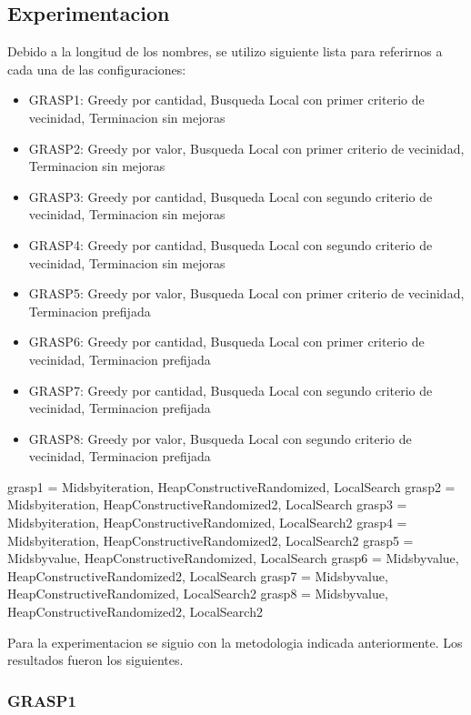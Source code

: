 \subsection{Experimentacion}

Debido a la longitud de los nombres, se utilizo siguiente lista para referirnos a cada una de las configuraciones:

\begin{itemize}
	\item GRASP1: Greedy por cantidad, Busqueda Local con primer criterio de vecinidad, Terminacion sin mejoras
	\item GRASP2: Greedy por valor, Busqueda Local con primer criterio de vecinidad, Terminacion sin mejoras
	\item GRASP3: Greedy por cantidad, Busqueda Local con segundo criterio de vecinidad, Terminacion sin mejoras
	\item GRASP4: Greedy por cantidad, Busqueda Local con segundo criterio de vecinidad, Terminacion sin mejoras
	\item GRASP5: Greedy por valor, Busqueda Local con primer criterio de vecinidad, Terminacion prefijada
	\item GRASP6: Greedy por cantidad, Busqueda Local con primer criterio de vecinidad, Terminacion prefijada
	\item GRASP7: Greedy por cantidad, Busqueda Local con segundo criterio de vecinidad, Terminacion prefijada
	\item GRASP8: Greedy por valor, Busqueda Local con segundo criterio de vecinidad, Terminacion prefijada
\end{itemize}

grasp1 = Midsbyiteration, HeapConstructiveRandomized, LocalSearch
grasp2 = Midsbyiteration, HeapConstructiveRandomized2, LocalSearch
grasp3 = Midsbyiteration, HeapConstructiveRandomized, LocalSearch2
grasp4 = Midsbyiteration, HeapConstructiveRandomized2, LocalSearch2
grasp5 = Midsbyvalue, HeapConstructiveRandomized, LocalSearch
grasp6 = Midsbyvalue, HeapConstructiveRandomized2, LocalSearch
grasp7 = Midsbyvalue, HeapConstructiveRandomized, LocalSearch2
grasp8 = Midsbyvalue, HeapConstructiveRandomized2, LocalSearch2

Para la experimentacion se siguio con la metodologia indicada anteriormente. Los resultados fueron los siguientes.

\newpage
\subsubsection{GRASP1}

